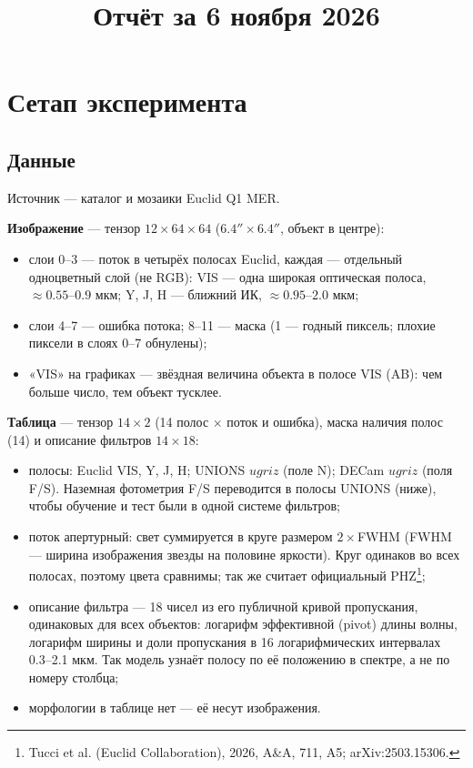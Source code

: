 \documentclass[11pt,a4paper]{article}
\title{Отчёт за 6 ноября 2026}
\author{}
\date{}
\begin{document}
\maketitle

\section{Сетап эксперимента}

\subsection{Данные}

Источник — каталог и мозаики Euclid Q1 MER.

\textbf{Изображение} — тензор $12\times64\times64$ ($6.4''\times6.4''$, объект в центре):
\begin{itemize}
  \item слои 0–3 — поток в четырёх полосах Euclid, каждая — отдельный одноцветный слой (не RGB): VIS — одна широкая оптическая полоса, $\approx0.55$–$0.9$ мкм; Y, J, H — ближний ИК, $\approx0.95$–$2.0$ мкм;
  \item слои 4–7 — ошибка потока; 8–11 — маска (1 — годный пиксель; плохие пиксели в слоях 0–7 обнулены);
  \item «VIS» на графиках — звёздная величина объекта в полосе VIS (AB): чем больше число, тем объект тусклее.
\end{itemize}

\textbf{Таблица} — тензор $14\times2$ (14 полос $\times$ поток и ошибка), маска наличия полос (14) и описание фильтров $14\times18$:
\begin{itemize}
  \item полосы: Euclid VIS, Y, J, H; UNIONS $ugriz$ (поле N); DECam $ugriz$ (поля F/S). Наземная фотометрия F/S переводится в полосы UNIONS (ниже), чтобы обучение и тест были в одной системе фильтров;
  \item поток апертурный: свет суммируется в круге размером $2\times$FWHM (FWHM — ширина изображения звезды на половине яркости). Круг одинаков во всех полосах, поэтому цвета сравнимы; так же считает официальный PHZ\footnote{\label{fn:tucci}Tucci et al. (Euclid Collaboration), 2026, A\&A, 711, A5; arXiv:2503.15306.};
  \item описание фильтра — 18 чисел из его публичной кривой пропускания, одинаковых для всех объектов: логарифм эффективной (pivot) длины волны, логарифм ширины и доли пропускания в 16 логарифмических интервалах 0.3–2.1 мкм. Так модель узнаёт полосу по её положению в спектре, а не по номеру столбца;
  \item морфологии в таблице нет — её несут изображения.
\end{itemize}
\end{document}
